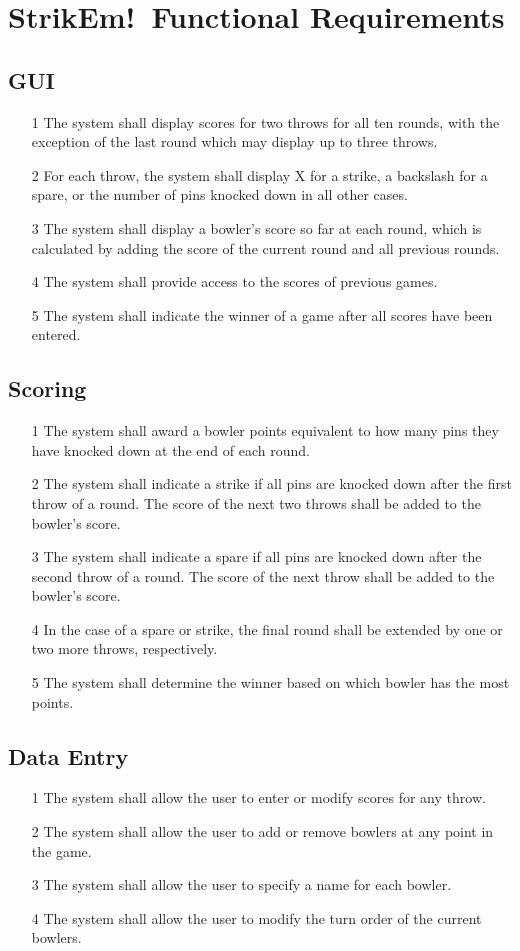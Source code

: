 \documentclass[11pt]{article}
\begin{document}
\section{StrikEm!\ Functional Requirements}
\subsection{GUI}
\begin{enumerate}
\item[1] The system shall display scores for two throws for all ten rounds, with the exception of the last round which may display up to three throws.
\item[2] For each throw, the system shall display X for a strike, a backslash for a spare, or the number of pins knocked down in all other cases.
\item[3] The system shall display a bowler's score so far at each round, which is calculated by adding the score of the current round and all previous rounds.
\item[4] The system shall provide access to the scores of previous games.
\item[5] The system shall indicate the winner of a game after all scores have been entered.
\end{enumerate}
\subsection{Scoring}
\begin{enumerate}
\item[1] The system shall award a bowler points equivalent to how many pins they have knocked down at the end of each round.
\item[2] The system shall indicate a strike if all pins are knocked down after the first throw of a round. The score of the next two throws shall be added to the bowler's score.
\item[3] The system shall indicate a spare if all pins are knocked down after the second throw of a round. The score of the next throw shall be added to the bowler's score.
\item[4] In the case of a spare or strike, the final round shall be extended by one or two more throws, respectively.
\item[5] The system shall determine the winner based on which bowler has the most points.
\end{enumerate}

\subsection{Data Entry}
\begin{enumerate}
\item[1] The system shall allow the user to enter or modify scores for any throw. 
\item[2] The system shall allow the user to add or remove bowlers at any point in the game.
\item[3] The system shall allow the user to specify a name for each bowler.
\item[4] The system shall allow the user to modify the turn order of the current bowlers.
\end{enumerate}
\end{document}
